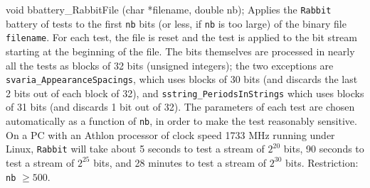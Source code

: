 void bbattery_RabbitFile (char *filename, double nb);
\endcode
  \tab Applies the {\tt Rabbit} battery of tests to the first {\tt nb}
   bits (or less, if {\tt nb} is too large) of the binary file
   {\tt filename}.
  For each test, the file is reset and the test is applied to the bit
  stream starting at the beginning of the file. The bits themselves are
  processed in nearly all the tests as blocks of 32 bits (unsigned
  integers); the two exceptions are {\tt svaria\_AppearanceSpacings},
  which uses blocks of 30 bits (and discards the last 2 bits out of
  each block of 32),
  and {\tt sstring\_PeriodsInStrings} which uses blocks of 31 bits (and
  discards 1 bit out of 32).
  The parameters of each test are chosen automatically as a function of
  {\tt nb}, in order to make the test reasonably sensitive.
  On a PC with an Athlon processor of clock speed
  1733 MHz running under Linux,  {\tt Rabbit} will take about 5 seconds to
  test a stream of $2^{20}$ bits, 90 seconds to test a stream of
  $2^{25}$ bits, and 28 minutes to test a stream of
  $2^{30}$ bits.
  Restriction: {\tt nb} $\ge 500$.
  \endtab

